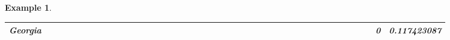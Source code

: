 \documentclass[a4paper,11pt]{report}
\newtheorem{example}[theorem]{Example}
\begin{document}
\begin{example}
\begin{appendices}
\begin{landscape}
\begin{longtable}{r|r|r|r|r|r|r|r|r|r|r|r|r|r|r|r|r|r|r|r|r|r|r|r|r|r|r|r|r|r|r|r|r|r|r|r|r|r|r|r|r|r|}
\multicolumn{1}{|r|}{\textbf{Georgia}}         &                                       &                                       &                                       &                                          &                                       &                                       &                                       &                                       &                                                &                                       &                                      &                                       &                                       &                                      &                                       &                                       &                                       &                                      &                                     &                                      &                                         &                                     &                                       &                                          &                                      &                                      &                                        &                                       &                                      &                                          &                                        &                                     &                                      &                                           &                                               &                                       &                                              &                                      &                                     & 0                                             & 0.117423087                             \\ \hline

\end{longtable}
\end{landscape}
\end{appendices}
\end{example}
\end{document}
